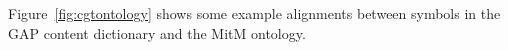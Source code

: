 Figure~\ref{fig:cgtontology} shows some example alignments between symbols in the GAP content dictionary and the MitM ontology.




%





